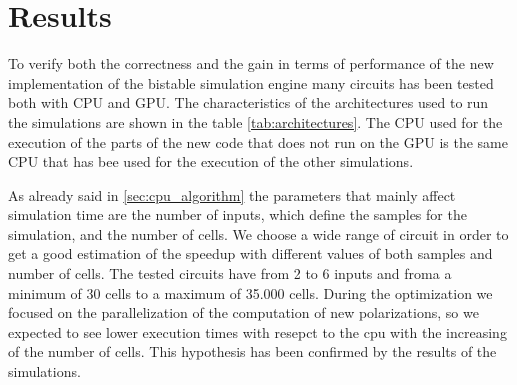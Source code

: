 \chapter{Results}\label{sec:results}
To verify both the correctness and the gain in terms of performance of the new implementation of the bistable simulation engine many circuits has been tested both with CPU and GPU. The characteristics of the architectures used to run the simulations are shown in the table \ref{tab:architectures}. The CPU used for the execution of the parts of the new code that does not run on the GPU is the same CPU that has bee used for the execution of the other simulations.

\begin{table}[h!tb]
   \centering \caption{CPU simulation Profiling}
   \label{tab:architectures}
   \vskip 0.2cm
 \end{table}

As already said in \ref{sec:cpu_algorithm} the parameters that mainly affect simulation time are the number of inputs, which define the samples for the simulation, and the number of cells. We choose a wide range of circuit in order to get a good estimation of the speedup with different values of both samples and number of cells. The tested circuits have from 2 to 6  inputs and froma a minimum of 30 cells to a maximum of 35.000 cells. \newline
During the optimization we focused on the parallelization of the computation of new polarizations, so we expected to see lower execution times with resepct to the cpu with the increasing of the number of cells. This hypothesis has been confirmed by the results of the simulations.

